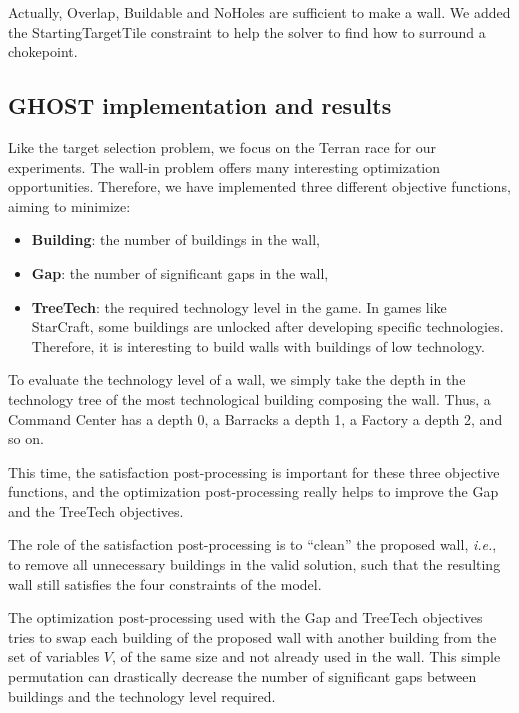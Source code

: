 \documentclass[journal]{IEEEtran}
\newcommand{\ghost}{\textsc{GHOST}\xspace}
\newcommand{\ie}{\textit{i.e.}}
\begin{document}
Actually,  Overlap, Buildable  and NoHoles  are sufficient  to make  a
wall. We added the StartingTargetTile constraint to help the solver to
find how to surround a chokepoint.

\subsection{\ghost implementation and results}

Like the  target selection problem, we focus on  the Terran race
for our experiments.    The  wall-in  problem  offers   many  interesting
optimization  opportunities.   Therefore,  we have  implemented  three
different objective functions, aiming to minimize:
\begin{itemize}
\item {\bf Building}: the number of buildings in the wall,
\item {\bf Gap}: the number of significant gaps in the wall,
\item {\bf  TreeTech}: the required  technology level in the  game. In
  games  like  StarCraft,  some buildings are unlocked after developing specific  technologies.
  Therefore,  it is interesting to  build walls
  with buildings of low technology.
\end{itemize}

To evaluate the  technology level of a wall, we  simply take the depth
in the  technology tree of  the most technological  building composing
the wall. Thus, a Command Center has  a depth 0, a Barracks a depth 1,
a Factory a depth 2, and so on.

This  time, the  satisfaction post-processing  is important  for these
three objective functions, and the optimization post-processing really
helps to improve the Gap and the TreeTech objectives.

The  role of  the  satisfaction post-processing  is  to ``clean''  the
proposed wall, \ie,  to remove all unnecessary buildings  in the valid
solution,  such  that the  resulting  wall  still satisfies  the  four
constraints of the model.

The  optimization  post-processing  used  with the  Gap  and  TreeTech
objectives  tries to  swap each  building  of the  proposed wall  with
another building from  the set of variables $V$, of  the same size and
not already used in the  wall. This simple permutation can drastically
decrease  the number  of significant  gaps between  buildings and  the
technology level required.
\end{document}
